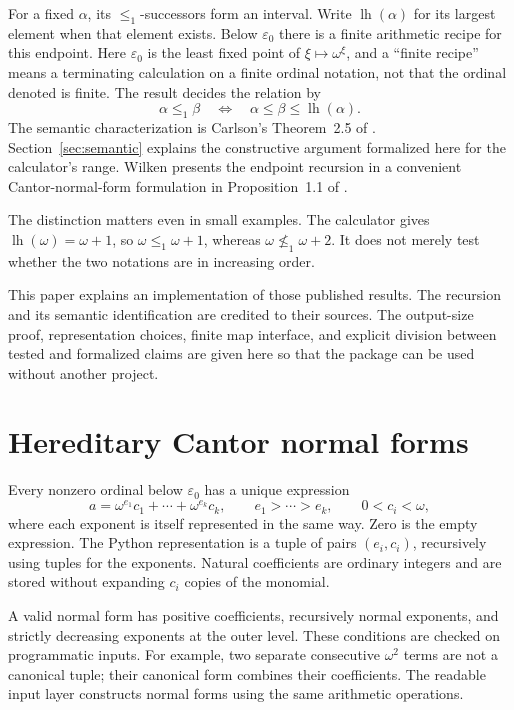 \documentclass[11pt]{article}
\newcommand{\lh}{\operatorname{lh}}
\begin{document}
For a fixed $\alpha$, its $\leq_1$-successors form an interval. Write
$\lh(\alpha)$ for its largest element when that element exists.
Below $\varepsilon_0$ there is a finite arithmetic recipe for this
endpoint. Here $\varepsilon_0$ is the least fixed point of
$\xi\mapsto\omega^\xi$, and a ``finite recipe'' means a terminating
calculation on a finite ordinal notation, not that the ordinal denoted
is finite. The result decides the relation by
\begin{equation}\label{eq:interval}
 \alpha\leq_1\beta
 \quad\Longleftrightarrow\quad
 \alpha\leq\beta\leq\lh(\alpha).
\end{equation}
The semantic characterization is Carlson's Theorem~2.5 of
\cite{Carlson1999}. Section~\ref{sec:semantic} explains the constructive
argument formalized here for the calculator's range. Wilken presents the endpoint recursion
in a convenient Cantor-normal-form formulation in Proposition~1.1 of
\cite{Wilken2021}.

The distinction matters even in small examples. The calculator gives
$\lh(\omega)=\omega+1$, so $\omega\leq_1\omega+1$, whereas
$\omega\not\leq_1\omega+2$. It does not merely test whether the two
notations are in increasing order.

This paper explains an implementation of those published results.
The recursion and its semantic identification are credited to their
sources. The output-size proof, representation choices, finite map
interface, and explicit division between tested and formalized claims
are given here so that the package can be used without another project.

\section{Hereditary Cantor normal forms}

Every nonzero ordinal below $\varepsilon_0$ has a unique expression
\[
 a=\omega^{e_1}c_1+\cdots+\omega^{e_k}c_k,
 \qquad e_1>\cdots>e_k,\qquad 0<c_i<\omega,
\]
where each exponent is itself represented in the same way. Zero is the
empty expression. The Python representation is a tuple of pairs
$(e_i,c_i)$, recursively using tuples for the exponents. Natural
coefficients are ordinary integers and are stored without expanding
$c_i$ copies of the monomial.

A valid normal form has positive coefficients, recursively normal
exponents, and strictly decreasing exponents at the outer level.
These conditions are checked on programmatic inputs. For example, two
separate consecutive $\omega^2$ terms are not a canonical tuple; their
canonical form combines their coefficients. The readable input layer
constructs normal forms using the same arithmetic operations.
\end{document}
